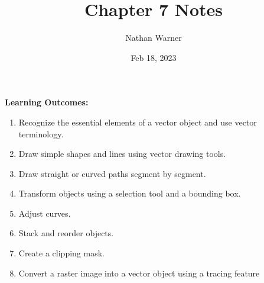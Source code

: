 \documentclass{report}
\title{\Huge{Chapter 7 Notes}}
\author{\huge{Nathan Warner}}
\date{\huge{Feb 18, 2023}}
\begin{document}
    \maketitle
    \begin{Large}
        \noindent \textbf{Learning Outcomes:}
    \end{Large}
    \bigbreak \noindent 
    \begin{enumerate}
        \item Recognize the essential elements of a vector object and use vector terminology.
        \item Draw simple shapes and lines using vector drawing tools.
        \item Draw straight or curved paths segment by segment.
        \item Transform objects using a selection tool and a bounding box. 
        \item Adjust curves.
        \item Stack and reorder objects.
        \item Create a clipping mask.
        \item Convert a raster image into a vector object using a tracing feature 
    \end{enumerate}
\end{document}

